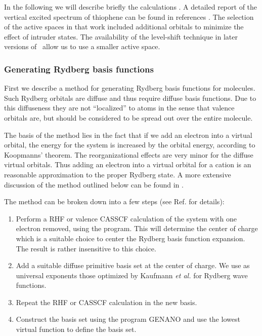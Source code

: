 In the following we will describe briefly the calculations \cite{Serrano:94th}. 
A detailed report of the vertical excited spectrum of thiophene can be found
in references \cite{Serrano:94th,Serrano:93d}. The selection of the active spaces in that
work included additional orbitals to minimize the effect of intruder
states. The availability of the level-shift technique in later versions of 
\molcas\ allow us to use a smaller active space.

\subsubsection{Generating Rydberg basis functions}
\label{TUT:sec:make_rydberg_basis_sets}

First we describe a method for generating Rydberg basis functions 
for molecules.
Such Rydberg orbitals are diffuse and thus require
diffuse basis functions. Due to this diffuseness they are not
``localized'' to atoms in the sense that valence orbitals are, but
should be considered to be spread out over the entire molecule.

The basis of the method lies in the fact 
that if we add an electron into a virtual orbital, the energy
for the system is increased by the orbital energy, according to
Koopmanns' theorem.
The reorganizational effects are very minor for the diffuse
virtual orbitals. Thus adding an electron into a virtual orbital
for a cation is an reasonable approximation to the proper
Rydberg state.
A more extensive discussion of the method
outlined below can be found in \cite{Roos:96b}.

The method can be broken down into a few steps (see Ref. \cite{Roos:96b} for details):
\begin{enumerate}
\item
Perform a RHF or valence CASSCF calculation of the system with one electron
removed, using the  program.
This will determine the center of charge which is
a suitable choice to center the Rydberg basis function
expansion. The result is rather insensitive to this choice.
\item
Add a suitable diffuse primitive basis set at the center of charge.
We use as universal exponents those optimized by Kaufmann {\em et al.} \cite{Kaufmann:89}
for Rydberg wave functions.
\item
Repeat the RHF or CASSCF calculation in the new basis.
\item
Construct the basis set using the program GENANO and use the lowest virtual 
function to define the basis set.
\end{enumerate}

